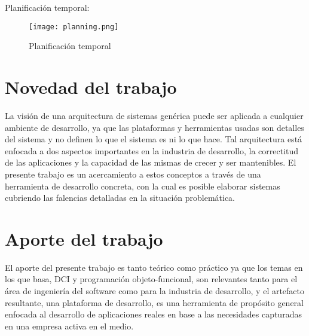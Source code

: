  \newpage
  Planificaci\'on temporal:
	\begin{figure}[!hbtp]
	  \centerline{\texttt{[image: planning.png]}}
	  \caption{Planificaci\'on temporal}
	\end{figure}
  \newpage


\section*{Novedad del trabajo}
  
  La visi\'on de una arquitectura de sistemas gen\'erica 
  puede ser aplicada a cualquier ambiente de desarrollo, 
  ya que las plataformas y herramientas usadas son detalles 
  del sistema y no definen lo que el sistema es ni lo que hace. 
  Tal arquitectura est\'a enfocada a dos aspectos importantes 
  en la industria de desarrollo, la correctitud de las aplicaciones 
  y la capacidad de las mismas de crecer y ser mantenibles. El 
  presente trabajo es un acercamiento a estos conceptos a trav\'es 
  de una herramienta de desarrollo concreta, con la cual es 
  posible elaborar sistemas cubriendo las falencias detalladas 
  en la situaci\'on problem\'atica.

\section*{Aporte del trabajo}
  
  El aporte del presente trabajo es tanto te\'orico como pr\'actico 
  ya que los temas en los que basa, \gls{DCI} y programaci\'on objeto-funcional, 
  son relevantes tanto para el \'area de ingenier\'ia 
  del software como para la industria de desarrollo, 
  y el artefacto resultante, una plataforma de desarrollo, 
  es una herramienta de prop\'osito
  general enfocada al desarrollo de aplicaciones reales en base 
  a las necesidades capturadas en una empresa activa en el medio. 

